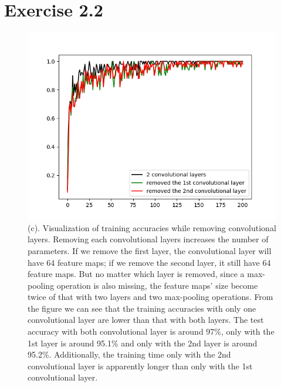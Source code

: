 \documentclass[11pt]{article} %
\begin{document}
\section*{Exercise 2.2}
\begin{figure}[htb]
  \centering
  \centerline{\includegraphics[width=1\textwidth ]{Figure_2_4.png}}
  \vspace{-5pt}
    \centering
\caption{(c). Visualization of training accuracies while removing convolutional layers. Removing each convolutional layers increases the number of parameters. If we remove the first layer, the convolutional layer will have 64 feature maps; if we remove the second layer, it still have 64 feature maps. But no matter which layer is removed, since a max-pooling operation is also missing, the feature maps' size become twice of that with two layers and two max-pooling operations. From the figure we can see that the training accuracies with only one convolutional layer are lower than that with both layers. The test accuracy with both convolutional layer is around 97\%, only with the 1st layer is around 95.1\% and only with the 2nd layer is around 95.2\%. Additionally, the training time only with the 2nd convolutional layer is apparently longer than only with the 1st convolutional layer.}
\vspace{-1pt}
\end{figure}
\end{document}

